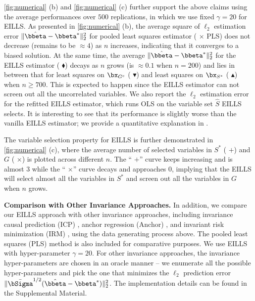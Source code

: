 \documentclass[10pt]{article}
\numberwithin{equation}{section}
\newcommand{\aosversion}[2]{\iftoggle{vaos}{#1}{#2}}
\newcommand{\blue}[1]{{\color{blue} #1}}
\newcommand{\myred}[1]{{\color{myred} #1}}
\newcommand{\myblue}[1]{{\color{myblue} #1}}
\newcommand{\mylightblue}[1]{{\color{mylightblue} #1}}
\newcommand{\myorange}[1]{{\color{myorange} #1}}
\begin{document}
{\cref{fig:numerical} (b) and \cref{fig:numerical} (c) further support the above claims using the average performances over $500$ replications, in which we use fixed $\gamma=20$ for EILLS. As presented in \cref{fig:numerical} (b), the average square of $\ell_2$ estimation error $\|\hat{\bbeta} - \bbeta^*\|_2^2$ for pooled least squares estimator (\mylightblue{$\times$} PLS) does not decrease (remains to be $\approx 4$) as $n$ increases, indicating that it converges to a biased solution. At the same time, the average $\|\hat{\bbeta} - \bbeta^*\|_2^2$ for the EILLS estimator (\myblue{$\blacklozenge$}) decays as $n$ grows (is $\approx 0.1$ when $n=200$) and lies in between that for least squares on $\bx_{G^c}$ (\myorange{$\blacktriangledown$}) and least squares on $\bx_{S^*}$ (\myred{$\blacktriangle$}) when $n\ge 700$. This is expected to happen since the EILLS estimator can not screen out all the uncorrelated variables.  We also report the $\ell_2$ estimation error for the refitted EILLS estimator, which runs OLS on the variable set $\hat{S}$ EILLS selects. It is interesting to see that its performance is slightly worse than the vanilla EILLS estimator; we provide a quantitative explanation in \aosversion{Appendix~\blue{D.5}}{\cref{sec:diagnosis}}.

The variable selection property for EILLS is further demonstrated in \cref{fig:numerical} (c), where the average number of selected variables in $S^*$ (\myblue{$+$}) and $G$ (\myred{$\times$}) is plotted across different $n$. The ``\myblue{$+$}'' curve keeps increasing and is almost $3$ while the ``\myred{$\times$}'' curve decays and approaches $0$, implying that the EILLS will select almost all the variables in $S^*$ and screen out all the variables in $G$ when $n$ grows.

\noindent \textbf{Comparison with Other Invariance Approaches.} In addition, we compare our EILLS approach with other invariance approaches, including invariance causal prediction (ICP) \citep{peters2016causal}, anchor regression (Anchor) \citep{rothenhausler2021anchor}, and invariant risk minimization (IRM) \citep{arjovsky2019invariant}, using the data generating process above. The pooled least squares (PLS) method is also included for comparative purposes. We use EILLS with hyper-parameter $\gamma=20$. For other invariance approaches, the invariance hyper-parameters are chosen in an oracle manner -- we enumerate all the possible hyper-parameters and pick the one that minimizes the $\ell_2$ prediction error $\|\bar{\bSigma}^{1/2}(\hat{\bbeta} - \bbeta^*)\|_2^2$. The implementation details can be found in the Supplemental Material.

}
\end{document}

